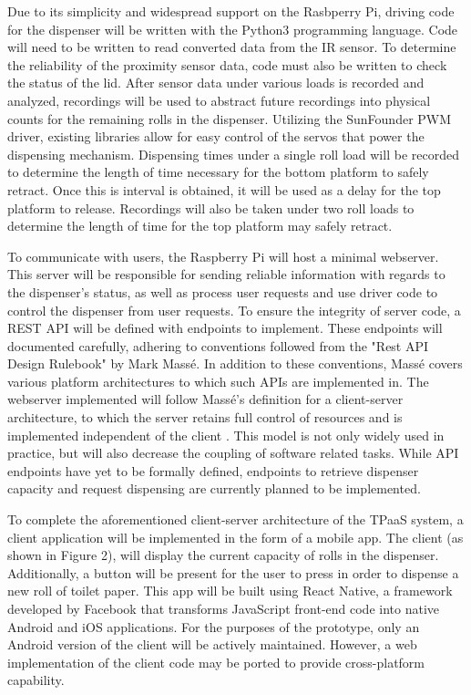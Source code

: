 \par Due to its simplicity and widespread support on the Rasbperry Pi, driving code for the dispenser will be written with the Python3 programming language. Code will need to be written to read converted data from the IR sensor. To determine the reliability of the proximity sensor data, code must also be written to check the status of the lid. After sensor data under various loads is recorded and analyzed, recordings will be used to abstract future recordings into physical counts for the remaining rolls in the dispenser. Utilizing the SunFounder PWM driver, existing libraries allow for easy control of the servos that power the dispensing mechanism. Dispensing times under a single roll load will be recorded to determine the length of time necessary for the bottom platform to safely retract. Once this is interval is obtained, it will be used as a delay for the top platform to release. Recordings will also be taken under two roll loads to determine the length of time for the top platform may safely retract.

\par To communicate with users, the Raspberry Pi will host a minimal webserver. This server will be responsible for sending reliable information with regards to the dispenser's status, as well as process user requests and use driver code to control the dispenser from user requests. To ensure the integrity of server code, a REST API will be defined with endpoints to implement. These endpoints will documented carefully, adhering to conventions followed from the "Rest API Design Rulebook" by Mark Massé. In addition to these conventions, Massé covers various platform architectures to which such APIs are implemented in. The webserver implemented will follow Massé's definition for a client-server architecture, to which the server retains full control of resources and is implemented independent of the client \cite{rest_api_rulebook}. This model is not only widely used in practice, but will also decrease the coupling of software related tasks. While API endpoints have yet to be formally defined, endpoints to retrieve dispenser capacity and request dispensing are currently planned to be implemented.

\par To complete the aforementioned client-server architecture of the TPaaS system, a client application will be implemented in the form of a mobile app. The client (as shown in Figure 2), will display the current capacity of rolls in the dispenser. Additionally, a button will be present for the user to press in order to dispense a new roll of toilet paper. This app will be built using React Native, a framework developed by Facebook that transforms JavaScript front-end code into native Android and iOS applications. For the purposes of the prototype, only an Android version of the client will be actively maintained. However, a web implementation of the client code may be ported to provide cross-platform capability.

